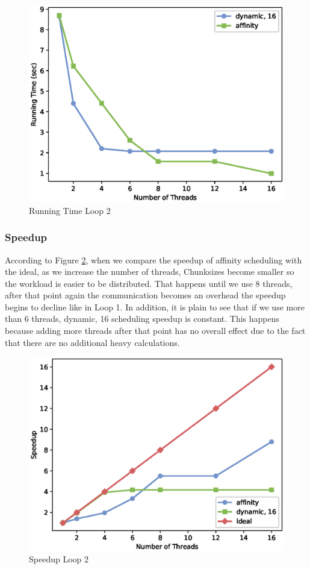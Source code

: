 \documentclass[12pt,a4paper]{article}
\begin{document}
\begin{figure}[ht]
    \centering
    \includegraphics[scale=0.6]{../graphs/loop2_running_time.eps}
    \caption{Running Time Loop 2}
    \label{runningTimeLoop2}
\end{figure}

\subsubsection{Speedup}

According to Figure \ref{speedupLoop2}, when we compare the speedup of affinity scheduling with the ideal, as we increase the number of threads, Chunksizes become smaller so the workload is easier to be distributed. That happens until we use 8 threads, after that point again the communication becomes an overhead the speedup begins to decline like in Loop 1. In addition, it is plain to see that if we use more than 6 threads, dynamic, 16 scheduling speedup is constant. This happens because adding more threads after that point has no overall effect due to the fact that there are no additional heavy calculations.

\begin{figure}[ht]
    \centering
    \includegraphics[scale=0.6]{../graphs/loop2_speedup.eps}
    \caption{Speedup Loop 2}
    \label{speedupLoop2}
\end{figure}
\end{document}
